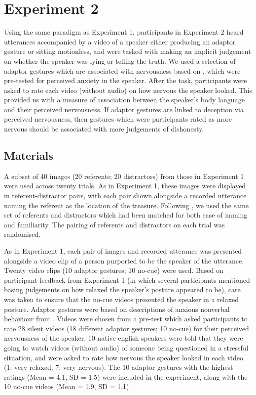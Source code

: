 \documentclass[a4paper,man,natbib]{apa6}
\begin{document}
\section{Experiment 2}
Using the same paradigm as Experiment 1, participants in Experiment 2 heard utterances accompanied by a video of a speaker either producing an adaptor gesture or sitting motionless, and were tasked with making an implicit judgement on whether the speaker was lying or telling the truth. 
We used a selection of adaptor gestures which are associated with nervousness based on \citet{Gregersen2005}, which were pre-tested for perceived anxiety in the speaker.
After the task, participants were asked to rate each video (without audio) on how nervous the speaker looked.
This provided us with a measure of association between the speaker's body language and their perceived nervousness.
If adaptor gestures are linked to deception via perceived nervousness, then gestures which were participants rated as more nervous should be associated with more judgements of dishonesty. 

\subsection{Materials}
A subset of 40 images (20 referents; 20 distractors) from those in Experiment 1 were used across twenty trials.
As in Experiment 1, these images were displayed in referent-distractor pairs, with each pair shown alongside a recorded utterance naming the referent as the location of the treasure.
Following \citet{Loy2017}, we used the same set of referents and distractors which had been matched for both ease of naming and familiarity.
The pairing of referents and distractors on each trial was randomised.

As in Experiment 1, each pair of images and recorded utterance was presented alongside a video clip of a person purported to be the speaker of the utterance.
Twenty video clips (10 adaptor gestures; 10 no-cue) were used. 
Based on participant feedback from Experiment 1 (in which several participants mentioned basing judgements on how relaxed the speaker's posture appeared to be), care was taken to ensure that the no-cue videos presented the speaker in a relaxed posture. 
Adaptor gestures were based on descriptions of anxious nonverbal behaviour from \citet{Gregersen2005}.
Videos were chosen from a pre-test which asked participants to rate 28 silent videos (18 different adaptor gestures; 10 no-cue) for their perceived nervousness of the speaker. 
10 native english speakers were told that they were going to watch videos (without audio) of someone being questioned in a stressful situation, and were asked to rate how nervous the speaker looked in each video (1: very relaxed, 7: very nervous). 
The 10 adaptor gestures with the highest ratings (Mean = 4.1, SD = 1.5) were included in the experiment, along with the 10 no-cue videos (Mean = 1.9, SD = 1.1).
\end{document}
